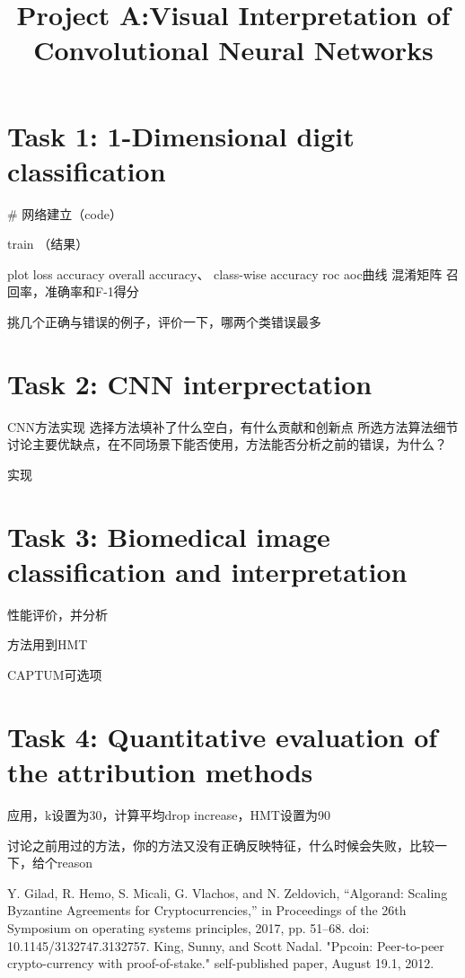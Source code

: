 \documentclass[conference]{IEEEtran}
\begin{document}
\title{Project A:Visual Interpretation of Convolutional Neural Networks}


\author{
\and
{}
}

\maketitle

\pagebreak

\begin{abstract}
\end{abstract}

\section{Task 1: 1-Dimensional digit classification}
# 网络建立（code）

train （结果）

plot loss accuracy
overall accuracy、 class-wise accuracy
roc aoc曲线
混淆矩阵
召回率，准确率和F-1得分

挑几个正确与错误的例子，评价一下，哪两个类错误最多
\section{Task 2: CNN interprectation}
CNN方法实现
选择方法填补了什么空白，有什么贡献和创新点
所选方法算法细节
讨论主要优缺点，在不同场景下能否使用，方法能否分析之前的错误，为什么？

实现

\section{Task 3: Biomedical image classification and interpretation}
性能评价，并分析

方法用到HMT

CAPTUM可选项

\section{Task 4: Quantitative evaluation of the attribution methods}
应用，k设置为30，计算平均drop increase，HMT设置为90

讨论之前用过的方法，你的方法又没有正确反映特征，什么时候会失败，比较一下，给个reason


\begin{thebibliography}{00}
Y. Gilad, R. Hemo, S. Micali, G. Vlachos, and N. Zeldovich, “Algorand: Scaling Byzantine Agreements for Cryptocurrencies,” in Proceedings of the 26th Symposium on operating systems principles, 2017, pp. 51–68. doi: 10.1145/3132747.3132757.
 King, Sunny, and Scott Nadal. "Ppcoin: Peer-to-peer crypto-currency with proof-of-stake." self-published paper, August 19.1, 2012.

\end{thebibliography}
\end{document}
